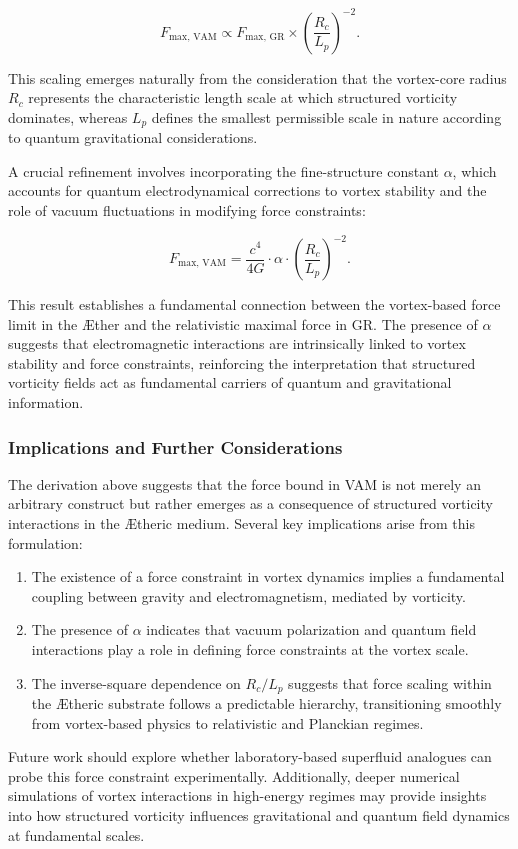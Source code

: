 \begin{equation}
F_{\text{max, VAM}} \propto F_{\text{max, GR}} \times \left(\frac{R_c}{L_p}\right)^{-2}.
\end{equation}


This scaling emerges naturally from the consideration that the vortex-core radius $R_c$ represents the characteristic length scale at which structured vorticity dominates, whereas $L_p$ defines the smallest permissible scale in nature according to quantum gravitational considerations.


A crucial refinement involves incorporating the fine-structure constant $\alpha$, which accounts for quantum electrodynamical corrections to vortex stability and the role of vacuum fluctuations in modifying force constraints:


\begin{equation}
F_{\text{max, VAM}} = \frac{c^4}{4G} \cdot \alpha \cdot \left(\frac{R_c}{L_p}\right)^{-2}.
\end{equation}


This result establishes a fundamental connection between the vortex-based force limit in the \AE ther and the relativistic maximal force in GR. The presence of $\alpha$ suggests that electromagnetic interactions are intrinsically linked to vortex stability and force constraints, reinforcing the interpretation that structured vorticity fields act as fundamental carriers of quantum and gravitational information.


\subsubsection*{Implications and Further Considerations}
The derivation above suggests that the force bound in VAM is not merely an arbitrary construct but rather emerges as a consequence of structured vorticity interactions in the \AE theric medium. Several key implications arise from this formulation:
\begin{enumerate}
\item The existence of a force constraint in vortex dynamics implies a fundamental coupling between gravity and electromagnetism, mediated by vorticity.
\item The presence of $\alpha$ indicates that vacuum polarization and quantum field interactions play a role in defining force constraints at the vortex scale.
\item The inverse-square dependence on $R_c/L_p$ suggests that force scaling within the \AE theric substrate follows a predictable hierarchy, transitioning smoothly from vortex-based physics to relativistic and Planckian regimes.
\end{enumerate}


Future work should explore whether laboratory-based superfluid analogues can probe this force constraint experimentally. Additionally, deeper numerical simulations of vortex interactions in high-energy regimes may provide insights into how structured vorticity influences gravitational and quantum field dynamics at fundamental scales.





